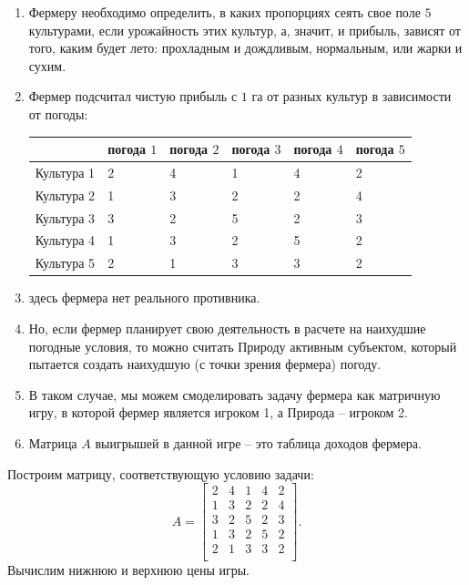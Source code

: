 \documentclass[11pt]{article}
\begin{document}
\begin{enumerate} 
  \item Фермеру необходимо определить, в каких пропорциях сеять свое поле $5$ культурами, если урожайность этих культур, а, значит, и прибыль, зависят от того, каким будет лето: прохладным и дождливым, нормальным, или жарки и сухим.
  \item Фермер подсчитал чистую прибыль с $1$ га от разных культур в зависимости от погоды:\\
\begin{tabular}{ |p{2.5cm}|p{2cm}|p{2cm}|p{2cm}|p{2cm}|p{2cm}|}
 \hline
  & погода $1$ & погода $2$ & погода $3$ & погода $4$ & погода $5$  \\
 \hline
 Культура 1& 2 & 4 & 1 & 4 & 2\\
  \hline
 Культура 2& 1 & 3 & 2 & 2 & 4\\
  \hline
 Культура 3& 3 & 2 & 5 & 2 & 3\\
  \hline
 Культура 4& 1 & 3 & 2 & 5 & 2\\
  \hline
 Культура 5& 2 & 1 & 3 & 3 & 2\\
 \hline
\end{tabular}
\item здесь  фермера нет реального противника.
\item Но, если фермер планирует свою деятельность в расчете на наихудшие погодные условия, то можно считать Природу активным субъектом, который пытается создать наихудшую (с точки зрения фермера) погоду.
\item В таком случае, мы можем смоделировать задачу фермера как матричную игру, в которой фермер является игроком 1, а Природа -- игроком 2.
\item Матрица $A$ выигрышей в данной игре -- это таблица доходов фермера.
\end{enumerate}

    Построим матрицу, соответствующую условию задачи: \[A = \begin{bmatrix}
 2 & 4 & 1 & 4 & 2\\
1 & 3 & 2 & 2 & 4\\
3 & 2 & 5 & 2 & 3\\
1 & 3 & 2 & 5 & 2\\
2 & 1 & 3 & 3 & 2\\
\end{bmatrix}.\] Вычислим нижнюю и верхнюю цены игры.
\end{document}
